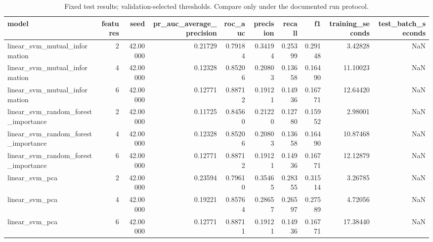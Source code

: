 \begin{table}
\caption{Fixed test results; validation-selected thresholds. Compare only under the documented run protocol.}
\begin{tabular}{lrrrrrrrrr}
\toprule
model & features & seed & pr\_auc\_average\_precision & roc\_auc & precision & recall & f1 & training\_seconds & test\_batch\_seconds \\
\midrule
linear\_svm\_mutual\_information & 2 & 42.00000 & 0.21729 & 0.79184 & 0.34194 & 0.25399 & 0.29148 & 3.42828 & NaN \\
linear\_svm\_mutual\_information & 4 & 42.00000 & 0.12328 & 0.85206 & 0.20803 & 0.13658 & 0.16490 & 11.10023 & NaN \\
linear\_svm\_mutual\_information & 6 & 42.00000 & 0.12771 & 0.88712 & 0.19121 & 0.14936 & 0.16771 & 12.64420 & NaN \\
linear\_svm\_random\_forest\_importance & 2 & 42.00000 & 0.11725 & 0.84560 & 0.21220 & 0.12780 & 0.15952 & 2.98001 & NaN \\
linear\_svm\_random\_forest\_importance & 4 & 42.00000 & 0.12328 & 0.85206 & 0.20803 & 0.13658 & 0.16490 & 10.87468 & NaN \\
linear\_svm\_random\_forest\_importance & 6 & 42.00000 & 0.12771 & 0.88712 & 0.19121 & 0.14936 & 0.16771 & 12.12879 & NaN \\
linear\_svm\_pca & 2 & 42.00000 & 0.23594 & 0.79610 & 0.35465 & 0.28355 & 0.31514 & 3.26785 & NaN \\
linear\_svm\_pca & 4 & 42.00000 & 0.19221 & 0.85764 & 0.28657 & 0.26597 & 0.27589 & 4.72056 & NaN \\
linear\_svm\_pca & 6 & 42.00000 & 0.12771 & 0.88711 & 0.19121 & 0.14936 & 0.16771 & 17.38440 & NaN \\
\bottomrule
\end{tabular}
\end{table}
